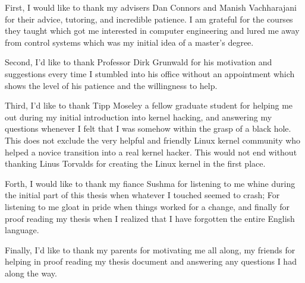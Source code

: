 First, I would like to thank my advisers Dan Connors and Manish Vachharajani 
for their advice, tutoring, and incredible patience. I am grateful for the courses they 
taught which got me interested in computer engineering and lured me away
from control systems which was my initial idea of a master's degree.

Second, I'd like to thank Professor Dirk Grunwald for his motivation and 
suggestions every time I stumbled into his office without an appointment
which shows the level of his patience and the willingness to help.  

Third, I'd like to thank Tipp Moseley a fellow graduate student for helping me
out during my initial introduction into kernel hacking, and answering 
my questions whenever I felt that I was somehow within the grasp of a black hole. 
This does not exclude the very helpful and friendly Linux kernel community 
who helped a novice transition into a real kernel hacker. This would not end 
without thanking Linus Torvalds for creating the Linux kernel in the first place.

Forth, I would like to thank my fiance Sushma for listening to me whine during 
the initial part of this thesis when whatever I touched seemed to crash; For 
listening to me gloat in pride when things worked for a change, and finally
for proof reading my thesis when I realized that I have forgotten the entire
English language.

Finally, I'd like to thank my parents for motivating me all along, my friends 
for helping in proof reading my thesis document and answering any questions I had
along the way. 